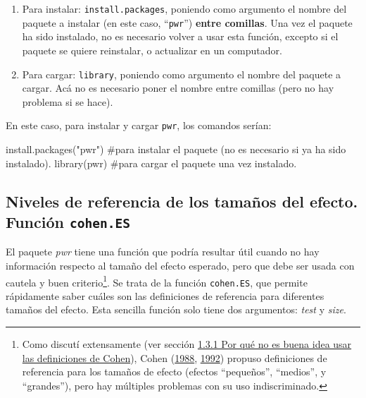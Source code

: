 \documentclass[
]{article}
\newenvironment{Shaded}{\begin{snugshade}}{\end{snugshade}}
\newcommand{\CommentTok}[1]{\textcolor[rgb]{0.48,0.49,0.49}{#1}}
\newcommand{\FunctionTok}[1]{\textcolor[rgb]{0.56,0.27,0.68}{#1}}
\newcommand{\NormalTok}[1]{\textcolor[rgb]{0.81,0.81,0.76}{#1}}
\newcommand{\StringTok}[1]{\textcolor[rgb]{0.96,0.31,0.31}{#1}}
\begin{document}
\begin{enumerate}
\def\labelenumi{\arabic{enumi}.}
\item
  Para instalar: \texttt{install.packages}, poniendo como argumento el
  nombre del paquete a instalar (en este caso, ``\texttt{pwr}'')
  \textbf{entre comillas}. Una vez el paquete ha sido instalado, no es
  necesario volver a usar esta función, excepto si el paquete se quiere
  reinstalar, o actualizar en un computador.
\item
  Para cargar: \texttt{library}, poniendo como argumento el nombre del
  paquete a cargar. Acá no es necesario poner el nombre entre comillas
  (pero no hay problema si se hace).
\end{enumerate}

En este caso, para instalar y cargar \texttt{pwr}, los comandos serían:

\begin{Shaded}
\begin{Highlighting}[]
\FunctionTok{install.packages}\NormalTok{(}\StringTok{"pwr"}\NormalTok{) }\CommentTok{\#para instalar el paquete (no es necesario si ya ha sido instalado).}
\FunctionTok{library}\NormalTok{(pwr) }\CommentTok{\#para cargar el paquete una vez instalado.}
\end{Highlighting}
\end{Shaded}

\hypertarget{niveles-de-referencia-de-los-tamauxf1os-del-efecto.-funciuxf3n-cohen.es}{%
\subsection{\texorpdfstring{Niveles de referencia de los tamaños del
efecto. Función
\texttt{cohen.ES}}{Niveles de referencia de los tamaños del efecto. Función cohen.ES}}\label{niveles-de-referencia-de-los-tamauxf1os-del-efecto.-funciuxf3n-cohen.es}}

El paquete \emph{pwr} tiene una función que podría resultar útil cuando
no hay información respecto al tamaño del efecto esperado, pero que debe
ser usada con cautela y buen criterio\footnote{Como discutí extensamente
  (ver sección \protect\hyperlink{probs}{1.3.1 Por qué no es buena idea
  usar las definiciones de Cohen}), Cohen
  (\protect\hyperlink{ref-cohenStatisticalPowerAnalysis1988}{1988},
  \protect\hyperlink{ref-cohenPowerPrimer1992}{1992}) propuso
  definiciones de referencia para los tamaños de efecto (efectos
  ``pequeños'', ``medios'', y ``grandes''), pero hay múltiples problemas
  con su uso indiscriminado.}. Se trata de la función \texttt{cohen.ES},
que permite rápidamente saber cuáles son las definiciones de referencia
para diferentes tamaños del efecto. Esta sencilla función solo tiene dos
argumentos: \emph{test} y \emph{size}.
\end{document}
